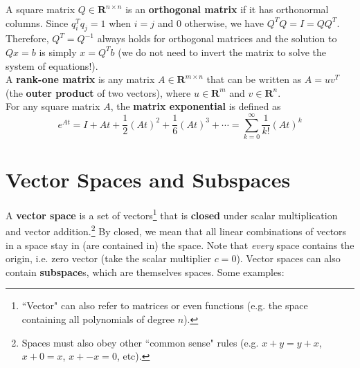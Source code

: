 \documentclass[11pt]{article}
\theoremstyle{plain}
\theoremstyle{definition}
\theoremstyle{remark}
\numberwithin{equation}{section}
\begin{document}
A square matrix $Q \in \mathbf{R}^{n \times n}$ is an {\bf orthogonal matrix} if it has orthonormal columns. Since $q_i^T q_j = 1$ when $i = j$ and $0$ otherwise, we have $Q^T Q = I = Q Q^T$. Therefore, $Q^T = Q^{-1}$ always holds for orthogonal matrices and the solution to $Qx = b$ is simply $x = Q^T b$ (we do not need to invert the matrix to solve the system of equations!).
\\

A {\bf rank-one matrix} is any matrix $A \in \mathbf{R}^{m \times n}$ that can be written as $A = u v^T$ (the {\bf outer product} of two vectors), where $u \in \mathbf{R}^m$ and $v \in \mathbf{R}^n$.
\\


For any square matrix $A$, the {\bf matrix exponential} is defined as
\begin{equation*}
e^{At} = I + A t + \frac{1}{2} (A t)^2 + \frac{1}{6} (A t)^3 + \cdots = \sum_{k = 0}^{\infty} \frac{1}{k!} (A t)^k
\end{equation*}










\section{Vector Spaces and Subspaces}

A {\bf vector space} is a set of vectors\footnote{``Vector" can also refer to matrices or even functions (e.g. the space containing all polynomials of degree $n$).} that is {\bf closed} under scalar multiplication and vector addition.\footnote{Spaces must also obey other ``common sense" rules (e.g. $x + y = y + x$, $x + 0 = x$, $x + -x = 0$, etc).} By closed, we mean that all linear combinations of vectors in a space stay in (are contained in) the space. Note that {\it every} space contains the origin, i.e. zero vector (take the scalar multiplier $c = 0$). Vector spaces can also contain {\bf subspace}s, which are themselves spaces. Some examples:
\end{document}
